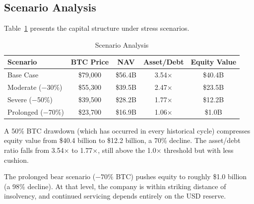 \subsection{Scenario Analysis}

Table~\ref{tab:scenarios_results} presents the capital structure under stress scenarios.

\begin{table}[H]
\centering
\caption{Scenario Analysis}
\label{tab:scenarios_results}
\begin{tabular}{@{}lcccc@{}}
\toprule
\textbf{Scenario} & \textbf{BTC Price} & \textbf{NAV} & \textbf{Asset/Debt} & \textbf{Equity Value} \\
\midrule
Base Case & \$79,000 & \$56.4B & 3.54$\times$ & \$40.4B \\
Moderate ($-$30\%) & \$55,300 & \$39.5B & 2.47$\times$ & \$23.5B \\
Severe ($-$50\%) & \$39,500 & \$28.2B & 1.77$\times$ & \$12.2B \\
Prolonged ($-$70\%) & \$23,700 & \$16.9B & 1.06$\times$ & \$1.0B \\
\bottomrule
\end{tabular}
\end{table}

A 50\% BTC drawdown (which has occurred in every historical cycle) compresses equity value from \$40.4 billion to \$12.2 billion, a 70\% decline. The asset/debt ratio falls from 3.54$\times$ to 1.77$\times$, still above the 1.0$\times$ threshold but with less cushion.

The prolonged bear scenario ($-70\%$ BTC) pushes equity to roughly \$1.0 billion (a 98\% decline). At that level, the company is within striking distance of insolvency, and continued servicing depends entirely on the USD reserve.

